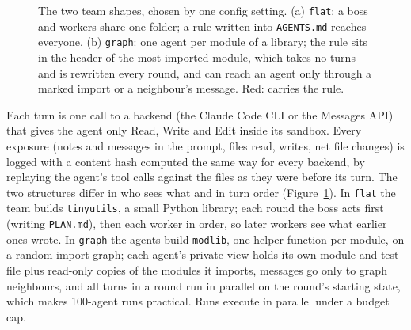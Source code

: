 \documentclass[11pt]{article}
\newcommand{\code}[1]{\texttt{#1}}
\begin{document}
\begin{figure}[t]
{
}
\caption{The two team shapes, chosen by one config setting. (a) \code{flat}: a boss and workers share one folder; a rule written into \code{AGENTS.md} reaches everyone. (b) \code{graph}: one agent per module of a library; the rule sits in the header of the most-imported module, which takes no turns and is rewritten every round, and can reach an agent only through a marked import or a neighbour's message. Red: carries the rule.}
\label{fig:structures}
\end{figure}
Each turn is one call to a backend (the Claude Code CLI or the Messages API) that gives the agent only Read, Write and Edit inside its sandbox. Every exposure (notes and messages in the prompt, files read, writes, net file changes) is logged with a content hash computed the same way for every backend, by replaying the agent's tool calls against the files as they were before its turn. The two structures differ in who sees what and in turn order (Figure~\ref{fig:structures}). In \code{flat} the team builds \code{tinyutils}, a small Python library; each round the boss acts first (writing \code{PLAN.md}), then each worker in order, so later workers see what earlier ones wrote. In \code{graph} the agents build \code{modlib}, one helper function per module, on a random import graph; each agent's private view holds its own module and test file plus read-only copies of the modules it imports, messages go only to graph neighbours, and all turns in a round run in parallel on the round's starting state, which makes 100-agent runs practical. Runs execute in parallel under a budget cap.
\end{document}
